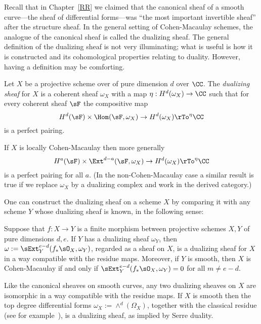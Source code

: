 Recall that in Chapter~\ref{RR} we claimed that the canonical sheaf of a smooth curve---the sheaf of differential forms---was ``the most important invertible sheaf'' after the structure sheaf. In the general setting of Cohen-Macaulay schemes, the analogue of the canonical sheaf is called the dualizing sheaf.
The general definition of the dualizing sheaf is not very illuminating; what is useful is how it is constructed and its cohomological properties relating to duality.
However, having a definition may be comforting. 

\begin{definition}
Let $X$ be a projective scheme over of pure dimension $d$ over $\CC$. The \emph{dualizing sheaf} for $X$ is a coherent sheaf $\omega_X$ 
with a map $\eta: H^d(\omega_X) \to \CC$ such that for every coherent sheaf  $\sF$ the compositive map
$$
H^d(\sF) \times \Hom(\sF, \omega_X) \to H^d(\omega_X) \rTo^\eta \CC
$$
is a perfect pairing. 
\end{definition}

\begin{fact}
If $X$ is locally Cohen-Macaulay then more generally
$$
H^a(\sF) \times \Ext^{d-a}(\sF, \omega_X) \to H^d(\omega_X) \rTo^\eta \CC
$$
is a perfect pairing for all $a$. (In the non-Cohen-Macaulay case a similar result is true if we replace $\omega_X$ by a dualizing complex
and work in the derived category.) 
\end{fact}

One can construct the dualizing sheaf on a scheme
$X$ by comparing it with any scheme $Y$ whose dualizing sheaf is known, in the following sense:
\begin{fact} \label{construction of dualizing sheaf}\label{omega}\label{general adjunction}
Suppose that $f: X\to Y$ is a finite morphism between projective schemes $X,Y$ of pure dimensions $d,e$. If $Y$ has a dualizing sheaf $\omega_Y$,
then $\omega := \sExt_Y^{e-d}(f_*\sO_X,  \omega_Y)$, regarded as a sheaf on $X$, is a dualizing sheaf for $X$ in a way compatible with the residue maps.
Moreover, if $Y$ is smooth, then $X$ is Cohen-Macaulay if and only if $ \sExt_Y^{e-d}(f_*\sO_X,  \omega_Y)= 0$ for all $m\neq e-d$.
\end{fact}

Like the canonical sheaves on smooth curves, any two dualizing sheaves on  $X$ are isomorphic in a way compatible with the
residue maps. If $X$ is smooth then the top degree differential forms $\omega_X :=\wedge^d(\Omega_X)$,
together with the classical residue (see for example~\cite[p. 648, 708]{Griffiths-Harris1978}), is a dualizing sheaf, as implied by Serre duality. 

